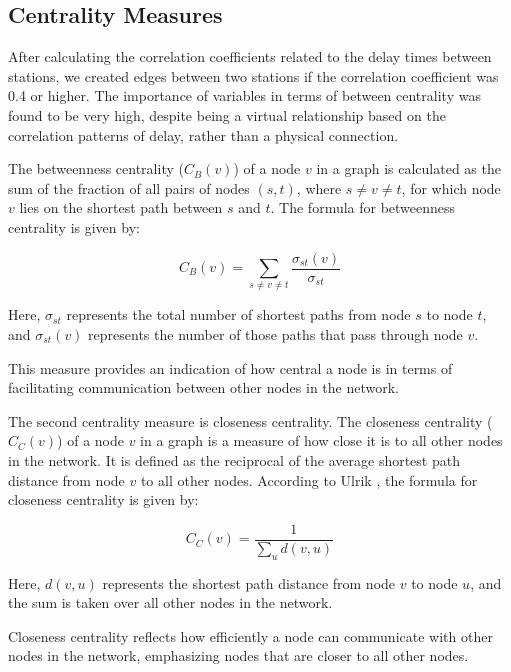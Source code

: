 \documentclass{article}
\theoremstyle{plain}
\theoremstyle{definition}
\theoremstyle{remark}
\begin{document}
\subsection{{Centrality Measures}}

After calculating the correlation coefficients related to the delay times between stations, we created edges between two stations if the correlation coefficient was 0.4 or higher. The importance of variables in terms of between centrality was found to be very high, despite being a virtual relationship based on the correlation patterns of delay, rather than a physical connection.


The betweenness centrality ($C_B(v)$) of a node $v$ in a graph is calculated as the sum of the fraction of all pairs of nodes $(s, t)$, where $s \neq v \neq t$, for which node $v$ lies on the shortest path between $s$ and $t$. The formula for betweenness centrality is given by:

\begin{equation}
C_B(v) = \sum_{s \neq v \neq t} \frac{\sigma_{st}(v)}{\sigma_{st}}
\end{equation}

Here, $\sigma_{st}$ represents the total number of shortest paths from node $s$ to node $t$, and $\sigma_{st}(v)$ represents the number of those paths that pass through node $v$.

This measure provides an indication of how central a node is in terms of facilitating communication between other nodes in the network.

The second centrality measure is closeness centrality. The closeness centrality ($C_C(v)$) of a node $v$ in a graph is a measure of how close it is to all other nodes in the network. It is defined as the reciprocal of the average shortest path distance from node $v$ to all other nodes. According to Ulrik \cite{generic_comp}, the formula for closeness centrality is given by:

\begin{equation}
C_C(v) = \frac{1}{\sum_{u} d(v, u)}
\end{equation}

Here, $d(v, u)$ represents the shortest path distance from node $v$ to node $u$, and the sum is taken over all other nodes in the network.

Closeness centrality reflects how efficiently a node can communicate with other nodes in the network, emphasizing nodes that are closer to all other nodes.
\end{document}
